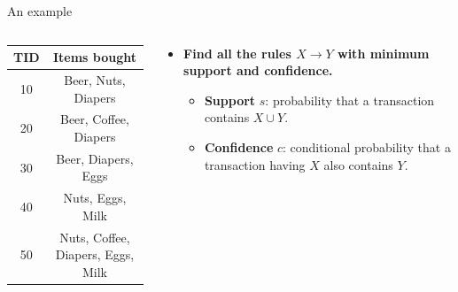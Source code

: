 \documentclass[aspectratio=169,t,xcolor=dvipsnames]{beamer}
\begin{document}
  {
    \begin{frame}{An example}
        \begin{columns}
          \begin{column}{0.4\textwidth}
          \begin{tabular}{|c|c|}
          \hline
          \textbf{TID} & \textbf{Items bought}\\\hline
          10 & Beer, Nuts, Diapers \\\hline
          20 & Beer, Coffee, Diapers \\\hline
          30 & Beer, Diapers, Eggs \\\hline
          40 & Nuts, Eggs, Milk \\\hline
          50 & Nuts, Coffee, Diapers, Eggs, Milk\\\hline
          \end{tabular}
          \end{column}
          \begin{column}{0.5\textwidth}
          \vspace{-2cm}
          \begin{itemize}
            \item \textbf{Find all the rules $X \rightarrow Y$ with minimum support and confidence.}
            \begin{itemize}
              \item \textbf{Support} $s$: probability that a transaction contains $X \cup Y$.
              \item \textbf{Confidence} $c$: conditional probability that a transaction having $X$ also contains $Y$.
            \end{itemize}

\end{itemize}
\end{column}
\end{columns}
\end{frame}}
\end{document}
